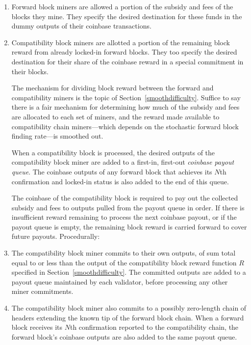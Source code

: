 \begin{enumerate}
  \item
    Forward block miners are allowed a portion of the subsidy and fees
    of the blocks they mine.  They specify the desired destination for
    these funds in the dummy outputs of their coinbase transactions.

  \item
    Compatibility block miners are allotted a portion of the remaining
    block reward from already locked-in forward blocks.  They too
    specify the desired destination for their share of the coinbase
    reward in a special commitment in their blocks.

The mechanism for dividing block reward between the forward and
compatibility miners is the topic of Section~\ref{smoothdifficulty}.
Suffice to say there is a fair mechanism for determining how much of
the subsidy and fees are allocated to each set of miners, and the
reward made available to compatibility chain miners---which depends on
the stochastic forward block finding rate---is smoothed out.

When a compatibility block is processed, the desired outputs of the
compatibility block miner are added to a first-in, first-out
\emph{coinbase payout queue}.  The coinbase outputs of any forward
block that achieves its $N$th confirmation and locked-in status is
also added to the end of this queue.

The coinbase of the compatibility block is required to pay out the
collected subsidy and fees to outputs pulled from the payout queue in
order.  If there is insufficient reward remaining to process the next
coinbase payout, or if the payout queue is empty, the remaining block
reward is carried forward to cover future payouts.  Procedurally:

  \item
    The compatibility block miner commits to their own outputs, of sum
    total equal to or less than the output of the compatibility block
    reward function $R$ specified in Section~\ref{smoothdifficulty}.
    The committed outputs are added to a payout queue maintained by
    each validator, before processing any other miner commitments.

  \item
    The compatibility block miner also commits to a possibly
    zero-length chain of headers extending the known tip of the
    forward block chain.  When a forward block receives its $N$th
    confirmation reported to the compatibility chain, the forward
    block's coinbase outputs are also added to the same payout queue.


\end{enumerate}
